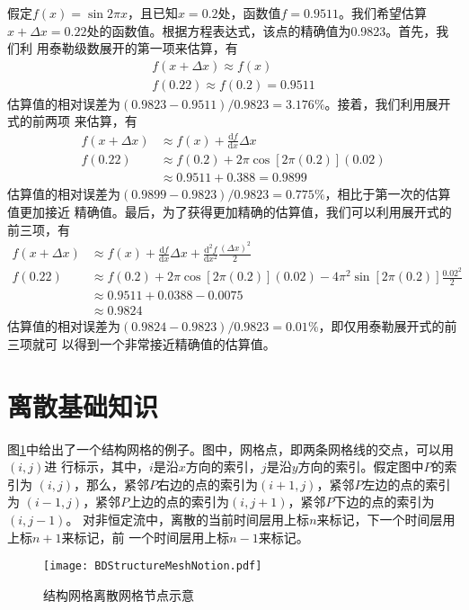 假定$f(x)=\sin{2\pi x}$，且已知$x=0.2$处，函数值$f=0.9511$。我们希望估算
$x+\Delta x=0.22$处的函数值。根据方程表达式，该点的精确值为0.9823。首先，我们利
用泰勒级数展开的第一项来估算，有
\begin{equation}
  \begin{aligned}
    f(x+\Delta x) \approx f(x)  \\
    f(0.22) \approx f(0.2) = 0.9511
  \end{aligned} 
\end{equation}
估算值的相对误差为$(0.9823-0.9511)/0.9823=3.176\%$。接着，我们利用展开式的前两项
来估算，有
\begin{equation}
  \begin{aligned}
    f(x+\Delta x) &\approx f(x) + \frac{\mathrm{d} f}{\mathrm{d} x}\Delta x
  \\
    f(0.22) &\approx f(0.2) + 2\pi\cos{[2\pi(0.2)]}(0.02)
    \\
            &\approx 0.9511 + 0.388 = 0.9899
\end{aligned}
\end{equation}
估算值的相对误差为$(0.9899-0.9823)/0.9823=0.775\%$，相比于第一次的估算值更加接近
精确值。最后，为了获得更加精确的估算值，我们可以利用展开式的前三项，有
\begin{equation}
  \begin{aligned}
    f(x+\Delta x) &\approx f(x) + \frac{\mathrm{d} f}{\mathrm{d} x}\Delta x
    +
    \frac{\mathrm{d}^{2} f}{\mathrm{d} x^{2}}\frac{(\Delta x)^{2}}{2}
  \\
    f(0.22) &\approx f(0.2) + 2\pi\cos{[2\pi(0.2)]}(0.02) -
    4\pi^{2}\sin{[2\pi(0.2)]}\frac{0.02^{2}}{2}
    \\
            &\approx 0.9511 + 0.0388 - 0.0075
    \\
            &\approx 0.9824
\end{aligned}
\end{equation}
估算值的相对误差为$(0.9824-0.9823)/0.9823=0.01\%$，即仅用泰勒展开式的前三项就可
以得到一个非常接近精确值的估算值。

\section{离散基础知识}
图\ref{FgBD_SMN}中给出了一个结构网格的例子。图中，网格点，即两条网格线的交点，可以用$(i,j)$进
行标示，其中，$i$是沿$x$方向的索引，$j$是沿$y$方向的索引。假定图中$P$的索引为
$(i,j)$，那么，紧邻$P$右边的点的索引为$(i+1,j)$，紧邻$P$左边的点的索引为
$(i-1,j)$，紧邻$P$上边的点的索引为$(i,j+1)$，紧邻$P$下边的点的索引为$(i,j-1)$。
对非恒定流中，离散的当前时间层用上标$n$来标记，下一个时间层用上标$n+1$来标记，前
一个时间层用上标$n-1$来标记。
\begin{figure}[ht]
  \centering
  \texttt{[image: BDStructureMeshNotion.pdf]}
  \caption{结构网格离散网格节点示意}
  \label{FgBD_SMN}
\end{figure}

